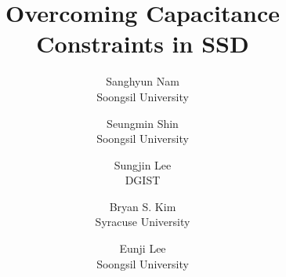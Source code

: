 \documentclass[letterpaper,twocolumn,10pt]{article}
\newcommand{\EUNJI}[1]{\textcolor{blue}{#1}}
\newcommand{\ours}{\texttt{Dawid}}
\begin{document}
\date{}

\title{\Large \bf Overcoming Capacitance Constraints in SSD}
\author{
{\rm Sanghyun Nam}\\
Soongsil University
\and
{\rm Seungmin Shin}\\
Soongsil University
\and
{\rm Sungjin Lee}\\
DGIST
\and
{\rm Bryan S. Kim}\\
Syracuse University
\and
{\rm Eunji Lee}\\
Soongsil University
}
\maketitle

\thispagestyle{empty}

\end{document}
